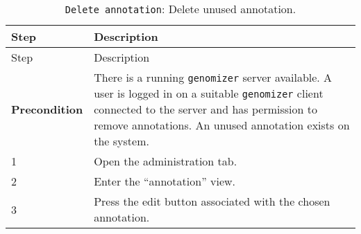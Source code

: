 \begin{longtable}[c]{@{}ll@{}}
\caption{\texttt{Delete\ annotation}: Delete unused
annotation.}\tabularnewline
\toprule
\begin{minipage}[b]{0.31\columnwidth}\raggedright\strut
Step
\strut\end{minipage} &
\begin{minipage}[b]{0.63\columnwidth}\raggedright\strut
Description
\strut\end{minipage}\tabularnewline
\midrule
\endfirsthead
\toprule
\begin{minipage}[b]{0.31\columnwidth}\raggedright\strut
Step
\strut\end{minipage} &
\begin{minipage}[b]{0.63\columnwidth}\raggedright\strut
Description
\strut\end{minipage}\tabularnewline
\midrule
\endhead
\begin{minipage}[t]{0.31\columnwidth}\raggedright\strut
\textbf{Precondition}
\strut\end{minipage} &
\begin{minipage}[t]{0.63\columnwidth}\raggedright\strut
There is a running \texttt{genomizer} server available. A user is logged
in on a suitable \texttt{genomizer} client connected to the server and
has permission to remove annotations. An unused annotation exists on the
system.
\strut\end{minipage}\tabularnewline
\begin{minipage}[t]{0.31\columnwidth}\raggedright\strut
1
\strut\end{minipage} &
\begin{minipage}[t]{0.63\columnwidth}\raggedright\strut
Open the administration tab.
\strut\end{minipage}\tabularnewline
\begin{minipage}[t]{0.31\columnwidth}\raggedright\strut
2
\strut\end{minipage} &
\begin{minipage}[t]{0.63\columnwidth}\raggedright\strut
Enter the ``annotation'' view.
\strut\end{minipage}\tabularnewline
\begin{minipage}[t]{0.31\columnwidth}\raggedright\strut
3
\strut\end{minipage} &
\begin{minipage}[t]{0.63\columnwidth}\raggedright\strut
Press the edit button associated with the chosen annotation.
\strut\end{minipage}\tabularnewline

\end{longtable}
